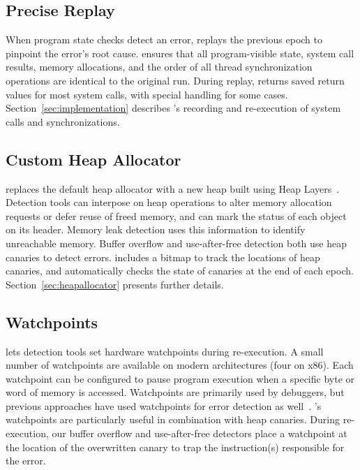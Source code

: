 \subsection{Precise Replay}

When program state checks detect an error, \doubletake{} replays the previous epoch to pinpoint the error's root cause. \doubletake{} ensures that all program-visible state, system call results, memory allocations, and the order of all thread synchronization operations are identical to the original run. During replay, \doubletake{} returns saved return values for most system calls, with special handling for some cases. Section~\ref{sec:implementation} describes \doubletake{}'s recording and re-execution of system calls and synchronizations.

\subsection{Custom Heap Allocator}

\doubletake{} replaces the default heap allocator with a new heap built using Heap Layers~\cite{heaplayers}. Detection tools can interpose on heap operations to alter memory allocation requests or defer reuse of freed memory, and can mark the status of each object on its header. Memory leak detection uses this information to identify unreachable memory. Buffer overflow and use-after-free detection both use heap canaries to detect errors. \doubletake{} includes a bitmap to track the locations of heap canaries, and automatically checks the state of canaries at the end of each epoch. Section~\ref{sec:heapallocator} presents further details.

\subsection{Watchpoints}

\doubletake{} lets detection tools set hardware watchpoints during re-execution. A small number of watchpoints are available on modern architectures (four on x86). Each watchpoint can be configured to pause program execution when a specific byte or word of memory is accessed. Watchpoints are primarily used by debuggers, but previous approaches have used watchpoints for error detection as well~\cite{Kivati,fastboundschecking}. \doubletake{}'s watchpoints are particularly useful in combination with heap canaries. During re-execution, our buffer overflow and use-after-free detectors place a watchpoint at the location of the overwritten canary to trap the instruction(s) responsible for the error.
